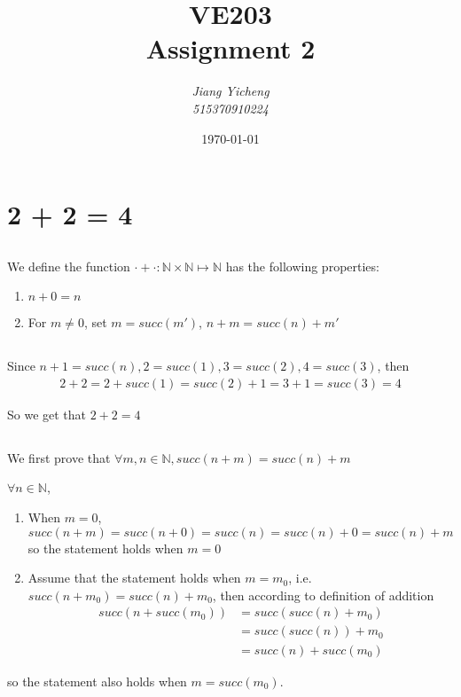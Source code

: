 \documentclass[a4paper,12pt,titlepage]{article}
\author{\textit{Jiang Yicheng}\\\textit{515370910224}}
\title{\textbf{VE203\\
		Assignment 2}}
\date{\today}
\begin{document}
\maketitle

\section{2 + 2 = 4}
\subsection{}
We define the function $\cdot+\cdot:\mathbb{N}\times\mathbb{N}\mapsto \mathbb{N}$ has the following properties:
\begin{enumerate}
\item $n+0=n$ 
\item For $m\neq0$, set $m=succ(m')$, $n+m=succ(n)+m'$
\end{enumerate}

\subsection{}
Since $n+1=succ(n),2=succ(1),3=succ(2),4=succ(3)$, then
\begin{align*}
2+2=2+succ(1)=succ(2)+1=3+1=succ(3)=4
\end{align*}

So we get that $2+2=4$

\subsection{}
We first prove that $\forall m,n\in\mathbb{N}, succ(n+m)=succ(n)+m$

$\forall n\in\mathbb{N}$,
\begin{enumerate}
\item When $m=0$, $succ(n+m)=succ(n+0)=succ(n)=succ(n)+0=succ(n)+m$
so the statement holds when $m=0$
\item Assume that the statement holds when $m=m_0$, i.e. $succ(n+m_0)=succ(n)+m_0$, then according to definition of addition
\begin{align*}
succ(n+succ(m_0))&=succ(succ(n)+m_0)\\
&=succ(succ(n))+m_0\\
&=succ(n)+succ(m_0)
\end{align*}
\end{enumerate}

so the statement also holds when $m=succ(m_0)$.
\end{document}
